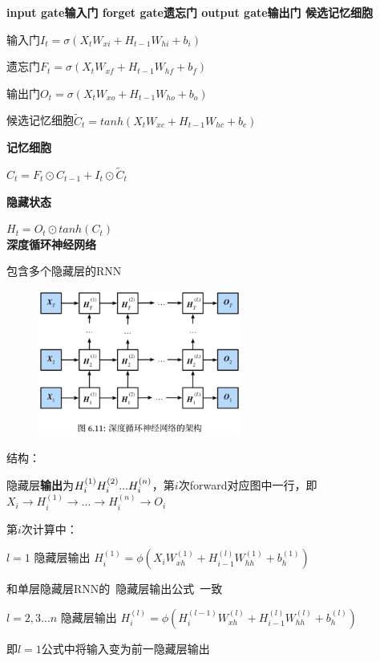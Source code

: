 \documentclass[UTF8]{ctexart}
\begin{document}
  \textbf{input gate输入门 forget gate遗忘门 output gate输出门 候选记忆细胞}

  \quad 输入门$I_t = \sigma(X_tW_{xi} + H_{t-1}W_{hi} + b_i)$

  \quad 遗忘门$F_t = \sigma(X_tW_{xf} + H_{t-1}W_{hf} + b_f)$
  
  \quad 输出门$O_t = \sigma(X_tW_{xo} + H_{t-1}W_{ho} + b_o)$

  \quad 候选记忆细胞$\tilde{C}_t = tanh(X_tW_{xc} + H_{t-1}W_{hc} + b_c) $

  \textbf{记忆细胞}

  \quad $C_t = F_t \odot C_{t-1} + I_t \odot \tilde{C}_t$

  \textbf{隐藏状态}

  \quad $H_t = O_t \odot tanh(C_t)$\\
\textbf{深度循环神经网络}

  包含多个隐藏层的RNN
  \begin{figure}[H] %
    \centering %
    \includegraphics[width=0.6\textwidth]{note_images/deep_RNN.png} %
  \end{figure}
  结构：

  \quad 隐藏层\textbf{输出}为$H_i^{(1)} \space H_i^{(2)}...H_i^{(n)}$，第$i$次forward对应图中一行，即$X_i \rightarrow  H_i^{(1)} \rightarrow  ... \rightarrow  H_i^{(n)} \rightarrow O_i$

  \quad 第$i$次计算中：

  \quad \quad $l = 1$ 隐藏层输出 $H_i^{(1)} = \phi (X_iW_{xh}^{(1)} + H_{i-1}^{(l)}W_{hh}^{(1)} + b_h^{(1)})$

  \quad \quad \quad 和单层隐藏层RNN的\ 隐藏层输出公式\ 一致

  \quad \quad $l = 2,3...n$ 隐藏层输出 $H_i^{(l)} = \phi (H_i^{(l-1)}W_{xh}^{(l)} + H_{i-1}^{(l)}W_{hh}^{(l)} + b_h^{(l)})$

  \quad \quad \quad 即$l=1$公式中将输入变为前一隐藏层输出
\end{document}
